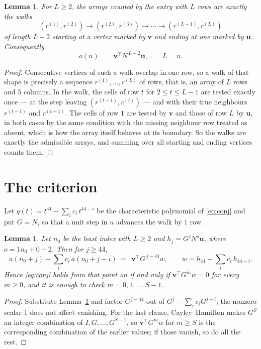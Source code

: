 \documentclass[11pt,a4paper]{article}
\theoremstyle{plain}
\newtheorem{lemma}[theorem]{Lemma}
\theoremstyle{definition}
\begin{document}
\begin{lemma}\label{lem:walk}
For $L\ge2$, the arrays counted by the entry with $L$ rows are exactly the walks
\[
(r^{(1)},r^{(2)})\to(r^{(2)},r^{(3)})\to\cdots\to(r^{(L-1)},r^{(L)})
\]
of length $L-2$ starting at a vertex marked by $\mathbf{v}$ and ending at one marked by
$\mathbf{u}$. Consequently
\[
a(n)\;=\;\,\mathbf{v}^{\!\top}N^{\,L-2}\mathbf{u},\qquad L=n .
\]
\end{lemma}

\begin{proof}
Consecutive vertices of such a walk overlap in one row, so a walk of that shape is
precisely a sequence $r^{(1)},\dots,r^{(L)}$ of rows, that is, an array of $L$ rows
and $5$ columns. In the walk, the cells of row $t$ for $2\le t\le L-1$ are tested
exactly once --- at the step leaving $(r^{(t-1)},r^{(t)})$ --- and with their true
neighbours $r^{(t-1)}$ and $r^{(t+1)}$. The cells of row $1$ are tested by
$\mathbf{v}$ and those of row $L$ by $\mathbf{u}$, in both cases by the same condition
with the missing neighbour row treated as absent, which is how the array itself behaves at
its boundary. So the walks are exactly the admissible arrays, and summing over all starting
and ending vertices counts them.
\end{proof}

\section{The criterion}

Let $q(t)=t^{44}-\sum_i c_i\,t^{44-i}$ be the characteristic polynomial of
\eqref{eq:conj} and put $G=N$, so that a unit step in $n$ advances the walk by
$1$ row.

\begin{lemma}\label{lem:crit}
Let $n_0$ be the least index with $L\ge2$ and $h_j=G^{j}N^{o}\mathbf{u}$, where
$o=1n_0+0-2$. Then for $j\ge44$,
\[
a(n_0+j)-\sum_i c_i\,a(n_0+j-i)\;=\;\,\mathbf{v}^{\!\top}G^{\,j-44}w,
\qquad w=h_{44}-\sum_i c_i\,h_{44-i} .
\]
Hence \eqref{eq:conj} holds from that point on if and only if
$\mathbf{v}^{\!\top}G^{m}w=0$ for every $m\ge0$, and it is enough to check
$m=0,1,\dots,S-1$.
\end{lemma}

\begin{proof}
Substitute Lemma~\ref{lem:walk} and factor $G^{j-44}$ out of
$G^{j}-\sum_ic_iG^{j-i}$; the nonzero scalar $1$ does not affect
vanishing. For the last clause, Cayley--Hamilton makes $G^{S}$ an integer combination of
$I,G,\dots,G^{S-1}$, so $\mathbf{v}^{\!\top}G^{m}w$ for $m\ge S$ is the corresponding
combination of the earlier values; if those vanish, so do all the rest.
\end{proof}
\end{document}
